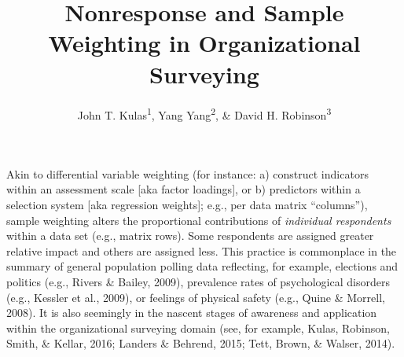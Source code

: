 \documentclass[
  ,man,floatsintext]{apa6}
\title{Nonresponse and Sample Weighting in Organizational Surveying}
\author{John T. Kulas\textsuperscript{1}, Yang Yang\textsuperscript{2}, \& David H. Robinson\textsuperscript{3}}
\date{}
\affiliation{\vspace{0.5cm}\textsuperscript{1} Montclair State University\\\textsuperscript{2} China Select\\\textsuperscript{3} St.~Cloud State University}
\begin{document}
\maketitle

Akin to differential variable weighting (for instance: a) construct indicators within an assessment scale {[}aka factor loadings{]}, or b) predictors within a selection system {[}aka regression weights{]}; e.g., per data matrix ``columns''), sample weighting alters the proportional contributions of \emph{individual respondents} within a data set (e.g., matrix rows). Some respondents are assigned greater relative impact and others are assigned less. This practice is commonplace in the summary of general population polling data reflecting, for example, elections and politics (e.g., Rivers \& Bailey, 2009), prevalence rates of psychological disorders (e.g., Kessler et al., 2009), or feelings of physical safety (e.g., Quine \& Morrell, 2008). It is also seemingly in the nascent stages of awareness and application within the organizational surveying domain (see, for example, Kulas, Robinson, Smith, \& Kellar, 2016; Landers \& Behrend, 2015; Tett, Brown, \& Walser, 2014).
\end{document}
